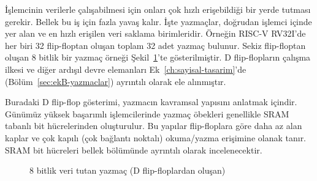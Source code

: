 İşlemcinin verilerle çalışabilmesi için onları çok hızlı erişebildiği bir yerde tutması gerekir. Bellek bu iş için fazla yavaş kalır. İşte yazmaçlar, doğrudan işlemci içinde yer alan ve en hızlı erişilen veri saklama birimleridir. Örneğin RISC-V RV32I'de her biri 32 flip-floptan oluşan toplam 32 adet yazmaç bulunur. Sekiz flip-floptan oluşan 8 bitlik bir yazmaç örneği Şekil~\ref{fig:8bit-yazmac}'te gösterilmiştir. D flip-flopların çalışma ilkesi ve diğer ardışıl devre elemanları Ek~\ref{ch:sayisal-tasarim}'de (Bölüm~\ref{sec:ekB-yazmaclar}) ayrıntılı olarak ele alınmıştır.

Buradaki D flip-flop gösterimi, yazmacın kavramsal yapısını anlatmak içindir. Günümüz yüksek başarımlı işlemcilerinde yazmaç öbekleri genellikle SRAM tabanlı bit hücrelerinden oluşturulur. Bu yapılar flip-floplara göre daha az alan kaplar ve çok kapılı (çok bağlantı noktalı) okuma/yazma erişimine olanak tanır. SRAM bit hücreleri bellek bölümünde ayrıntılı olarak incelenecektir.

\begin{figure}[H]
\centering
{}
\caption{8 bitlik veri tutan yazmaç (D flip-floplardan oluşan)}
\label{fig:8bit-yazmac}
\end{figure}

